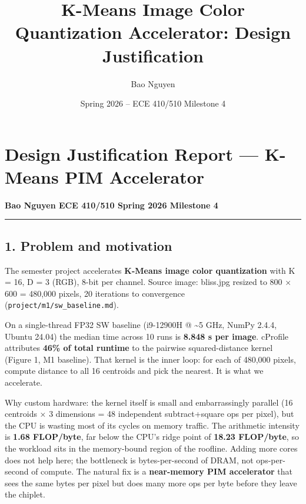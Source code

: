 \documentclass[
  10pt,
]{article}
\title{K-Means Image Color Quantization Accelerator: Design Justification}
\author{Bao Nguyen}
\date{Spring 2026 -- ECE 410/510 Milestone 4}
\begin{document}
\maketitle

{
\hypersetup{linkcolor=}
\setcounter{tocdepth}{3}
\tableofcontents
}
\hypertarget{design-justification-report-k-means-pim-accelerator}{%
\section{Design Justification Report --- K-Means PIM
Accelerator}\label{design-justification-report-k-means-pim-accelerator}}

\textbf{Bao Nguyen \textbar{} ECE 410/510 Spring 2026 \textbar{}
Milestone 4}

\begin{center}\rule{0.5\linewidth}{0.5pt}\end{center}

\hypertarget{problem-and-motivation}{%
\subsection{1. Problem and motivation}\label{problem-and-motivation}}

The semester project accelerates \textbf{K-Means image color
quantization} with K = 16, D = 3 (RGB), 8-bit per channel. Source image:
bliss.jpg resized to 800 × 600 = 480,000 pixels, 20 iterations to
convergence (\texttt{project/m1/sw\_baseline.md}).

On a single-thread FP32 SW baseline (i9-12900H @ \textasciitilde5 GHz,
NumPy 2.4.4, Ubuntu 24.04) the median time across 10 runs is
\textbf{8.848 s per image}. cProfile attributes \textbf{46\% of total
runtime} to the pairwise squared-distance kernel (Figure 1, M1
baseline). That kernel is the inner loop: for each of 480,000 pixels,
compute distance to all 16 centroids and pick the nearest. It is what we
accelerate.

Why custom hardware: the kernel itself is small and embarrassingly
parallel (16 centroids × 3 dimensions = 48 independent subtract+square
ops per pixel), but the CPU is wasting most of its cycles on memory
traffic. The arithmetic intensity is \textbf{1.68 FLOP/byte}, far below
the CPU's ridge point of \textbf{18.23 FLOP/byte}, so the workload sits
in the memory-bound region of the roofline. Adding more cores does not
help here; the bottleneck is bytes-per-second of DRAM, not
ops-per-second of compute. The natural fix is a \textbf{near-memory PIM
accelerator} that sees the same bytes per pixel but does many more ops
per byte before they leave the chiplet.
\end{document}
